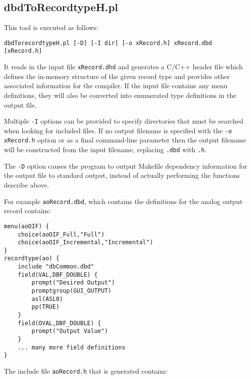 \subsection{dbdToRecordtypeH.pl}

This tool is executed as follows:

\begin{verbatim}
dbdTorecordtypeH.pl [-D] [-I dir] [-o xRecord.h] xRecord.dbd [xRecord.h]
\end{verbatim}

It reads in the input file \verb|xRecord.dhd| and generates a C/C++ header file which defines the in-memory structure of the given record type and provides other associated information for the compiler.
If the input file contains any menu definitions, they will also be converted into enumerated type definitions in the output file.

Multiple \verb|-I| options can be provided to specify directories that must be searched when looking for included files.
If no output filename is specified with the \verb|-o xRecord.h| option or as a final command-line parameter then the output filename will be constructed from the input filename, replacing \verb|.dbd| with \verb|.h|.

The \verb|-D| option causes the program to output Makefile dependency information for the output file to standard output, instead of actually performing the functions describe above.

For example \verb|aoRecord.dbd|, which contains the definitions for the analog output record contains:

\begin{verbatim}
menu(aoOIF) {
    choice(aoOIF_Full,"Full")
    choice(aoOIF_Incremental,"Incremental")
}
recordtype(ao) {
    include "dbCommon.dbd" 
    field(VAL,DBF_DOUBLE) {
        prompt("Desired Output")
        promptgroup(GUI_OUTPUT)
        asl(ASL0)
        pp(TRUE)
    }
    field(OVAL,DBF_DOUBLE) {
        prompt("Output Value")
    }
    ... many more field definitions
}
\end{verbatim}

The include file \verb|aoRecord.h| that is generated contains:

